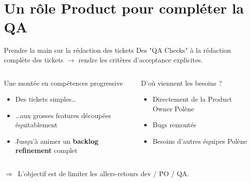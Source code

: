\section{Un rôle Product pour compléter la QA}

\begin{frame}{Prendre la main sur la rédaction des tickets}
  \footnotesize Des "QA Checks" à la rédaction complète des tickets $\rightarrow$ rendre les critères d'acceptance explicites.
  \vskip 8pt
  \begin{columns}[T]
    \begin{block}{Une montée en compétences progressive}
      \footnotesize
      \begin{itemize}
        \item Des tickets simples\dots
        \item \dots aux grosses features découpées équitablement
        \item Jusqu'à animer un \textbf{backlog refinement} complet
      \end{itemize}
    \end{block}
    \begin{exampleblock}{D'où viennent les besoins ?}
      \footnotesize
      \begin{itemize}
        \item Directement de la Product Owner Polène
        \item Bugs remontés
        \item Besoins d'autres équipes Polène
      \end{itemize}
    \end{exampleblock}
  \end{columns}
  \vskip 16pt
  {\footnotesize $\Rightarrow$~L'objectif est de limiter les allers-retours dev / PO / QA.}
\end{frame}
